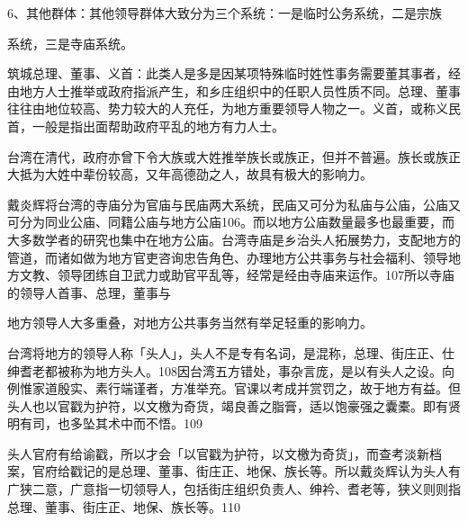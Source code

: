 6、其他群体：其他领导群体大致分为三个系统：一是临时公务系统，二是宗族

\begin{BookQuote}
系统，三是寺庙系统。
\end{BookQuote}


\noindent 筑城总理、董事、义首：此类人是多是因某项特殊临时姓性事务需要董其事者，经由地方人士推举或政府指派产生，和乡庄组织中的任职人员性质不同。总理、董事往往由地位较高、势力较大的人充任，为地方重要领导人物之一。义首，或称义民首，一般是指出面帮助政府平乱的地方有力人士。


\noindent 台湾在清代，政府亦曾下令大族或大姓推举族长或族正，但并不普遍。族长或族正大抵为大姓中辈份较高，又年高德劭之人，故具有极大的影响力。


\noindent 戴炎辉将台湾的寺庙分为官庙与民庙两大系统，民庙又可分为私庙与公庙，公庙又可分为同业公庙、同籍公庙与地方公庙106。而以地方公庙数量最多也最重要，而大多数学者的研究也集中在地方公庙。台湾寺庙是乡治头人拓展势力，支配地方的管道，而诸如做为地方官吏咨询忠告角色、办理地方公共事务与社会福利、领导地方文教、领导团练自卫武力或助官平乱等，经常是经由寺庙来运作。107所以寺庙的领导人首事、总理，董事与

\vfill
\begin{BookNotes}
\end{BookNotes}

\begin{BookQuote}
地方领导人大多重叠，对地方公共事务当然有举足轻重的影响力。
\end{BookQuote}


台湾将地方的领导人称「头人」，头人不是专有名词，是混称，总理、街庄正、仕绅耆老都被称为地方头人。108因台湾五方错处，事杂言庞，是以有头人之设。向例惟家道殷实、素行端谨者，方准举充。官课以考成并赏罚之，故于地方有益。但头人也以官戳为护符，以文檄为奇货，竭良善之脂膏，适以饱豪强之囊橐。即有贤明有司，也多坠其术中而不悟。109

头人官府有给谕戳，所以才会「以官戳为护符，以文檄为奇货」，而查考淡新档案，官府给戳记的是总理、董事、街庄正、地保、族长等。所以戴炎辉认为头人有广狭二意，广意指一切领导人，包括街庄组织负责人、绅衿、耆老等，狭义则则指总理、董事、街庄正、地保、族长等。110

